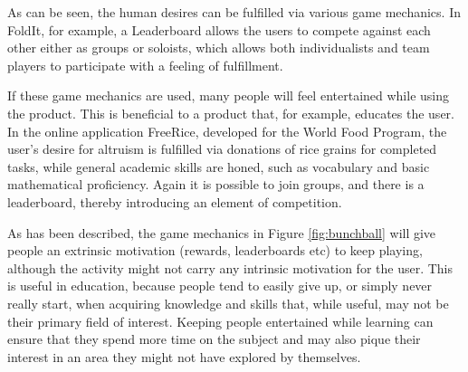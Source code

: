 As can be seen, the human desires can be fulfilled via various game mechanics. In FoldIt, for example, a Leaderboard allows the users to compete against each other either as groups or soloists, which allows both individualists and team players to participate with a feeling of fulfillment. 

If these game mechanics are used, many people will feel entertained while using the product. This is beneficial to a product that, for example, educates the user. In the online application FreeRice, developed for the World Food Program, the user's desire for altruism is fulfilled via donations of rice grains for completed tasks, while general academic skills are honed, such as vocabulary and basic mathematical proficiency. Again it is possible to join groups, and there is a leaderboard, thereby introducing an element of competition.\cite{freerice}

As has been described, the game mechanics in Figure \ref{fig:bunchball} will give people an extrinsic motivation (rewards, leaderboards etc) to keep playing, although the activity might not carry any intrinsic motivation for the user. This is useful in education, because people tend to easily give up, or simply never really start, when acquiring knowledge and skills that, while useful, may not be their primary field of interest. Keeping people entertained while learning can ensure that they spend more time on the subject and may also pique their interest in an area they might not have explored by themselves.
